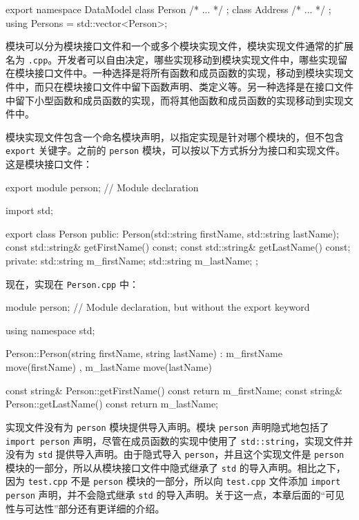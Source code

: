 \begin{cpp}
export
{
    namespace DataModel
    {
        class Person { /* ... */ };
        class Address { /* ... */ };
        using Persons = std::vector<Person>;
    }
}
\end{cpp}



模块可以分为模块接口文件和一个或多个模块实现文件，模块实现文件通常的扩展名为 \verb|.cpp|。开发者可以自由决定，哪些实现移动到模块实现文件中，哪些实现留在模块接口文件中。一种选择是将所有函数和成员函数的实现，移动到模块实现文件中，而只在模块接口文件中留下函数声明、类定义等。另一种选择是在接口文件中留下小型函数和成员函数的实现，而将其他函数和成员函数的实现移动到实现文件中。

模块实现文件包含一个命名模块声明，以指定实现是针对哪个模块的，但不包含 \verb|export| 关键字。之前的 \verb|person| 模块，可以按以下方式拆分为接口和实现文件。这是模块接口文件：

\begin{cpp}
export module person; // Module declaration

import std;

export class Person
{
    public:
        Person(std::string firstName, std::string lastName);
        const std::string& getFirstName() const;
        const std::string& getLastName() const;
    private:
        std::string m_firstName;
        std::string m_lastName;
};
\end{cpp}

现在，实现在 \verb|Person.cpp| 中：

\begin{cpp}
module person; // Module declaration, but without the export keyword

using namespace std;

Person::Person(string firstName, string lastName)
: m_firstName { move(firstName) }, m_lastName { move(lastName) }
{}

const string& Person::getFirstName() const { return m_firstName; }
const string& Person::getLastName() const { return m_lastName; }
\end{cpp}

实现文件没有为 \verb|person| 模块提供导入声明。模块 \verb|person| 声明隐式地包括了 \verb|import person| 声明，尽管在成员函数的实现中使用了 \verb|std::string|，实现文件并没有为 \verb|std| 提供导入声明。由于隐式导入 \verb|person|，并且这个实现文件是 \verb|person| 模块的一部分，所以从模块接口文件中隐式继承了 \verb|std| 的导入声明。相比之下，因为 \verb|test.cpp| 不是 \verb|person| 模块的一部分，所以向 \verb|test.cpp| 文件添加 \verb|import person| 声明，并不会隐式继承 \verb|std| 的导入声明。关于这一点，本章后面的“可见性与可达性”部分还有更详细的介绍。


